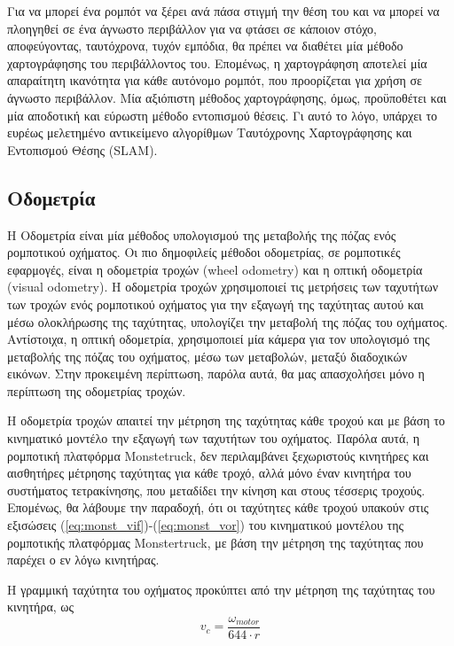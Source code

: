 \bigskip
Για να μπορεί ένα ρομπότ να ξέρει ανά πάσα στιγμή την θέση του και να μπορεί να πλοηγηθεί σε ένα άγνωστο περιβάλλον για να φτάσει σε κάποιον στόχο, αποφεύγοντας, ταυτόχρονα, τυχόν εμπόδια, θα πρέπει να διαθέτει μία μέθοδο χαρτογράφησης του περιβάλλοντος του. Επομένως, η χαρτογράφηση αποτελεί μία απαραίτητη ικανότητα για κάθε αυτόνομο ρομπότ, που προορίζεται για χρήση σε άγνωστο περιβάλλον. Μία αξιόπιστη μέθοδος χαρτογράφησης, όμως, προϋποθέτει και μία αποδοτική και εύρωστη μέθοδο εντοπισμού θέσεις. Γι αυτό το λόγο, υπάρχει το ευρέως μελετημένο αντικείμενο αλγορίθμων {Ταυτόχρονης Χαρτογράφησης και Εντοπισμού Θέσης} ({SLAM}).

\bigskip
\subsection{Οδομετρία} \label{ssec:odometry}
Η Οδομετρία είναι μία μέθοδος υπολογισμού της μεταβολής της {πόζας} ενός ρομποτικού οχήματος. Οι πιο δημοφιλείς μέθοδοι οδομετρίας, σε ρομποτικές εφαρμογές, είναι η {οδομετρία τροχών (wheel odometry)} και η {οπτική οδομετρία (visual odometry)}. Η {οδομετρία τροχών} χρησιμοποιεί τις μετρήσεις των ταχυτήτων των τροχών ενός ρομποτικού οχήματος για την εξαγωγή της ταχύτητας αυτού και μέσω ολοκλήρωσης της ταχύτητας, υπολογίζει την μεταβολή της πόζας του οχήματος. Αντίστοιχα, η {οπτική οδομετρία}, χρησιμοποιεί μία κάμερα για τον υπολογισμό της μεταβολής της πόζας του οχήματος, μέσω των μεταβολών, μεταξύ διαδοχικών εικόνων. Στην προκειμένη περίπτωση, παρόλα αυτά, θα μας απασχολήσει μόνο η περίπτωση της {οδομετρίας τροχών}.

\bigskip
Η {οδομετρία τροχών} απαιτεί την μέτρηση της ταχύτητας κάθε τροχού και με βάση το κινηματικό μοντέλο την εξαγωγή των ταχυτήτων του οχήματος. Παρόλα αυτά, η ρομποτική πλατφόρμα {Monstetruck}, δεν περιλαμβάνει ξεχωριστούς κινητήρες και αισθητήρες μέτρησης ταχύτητας για κάθε τροχό, αλλά μόνο έναν κινητήρα του συστήματος {τετρακίνησης}, που μεταδίδει την κίνηση και στους τέσσερις τροχούς. Επομένως, θα λάβουμε την παραδοχή, ότι οι ταχύτητες κάθε τροχού υπακούν στις εξισώσεις (\ref{eq:monst_vif})-(\ref{eq:monst_vor}) του κινηματικού μοντέλου της ρομποτικής πλατφόρμας {Monstertruck}, με βάση την μέτρηση της ταχύτητας που παρέχει ο εν λόγω κινητήρας.

\bigskip
Η γραμμική ταχύτητα του οχήματος προκύπτει από την μέτρηση της ταχύτητας του κινητήρα, ως
\begin{equation}
	v_c = \frac{\omega_{motor}}{644 \cdot r}
\end{equation}

